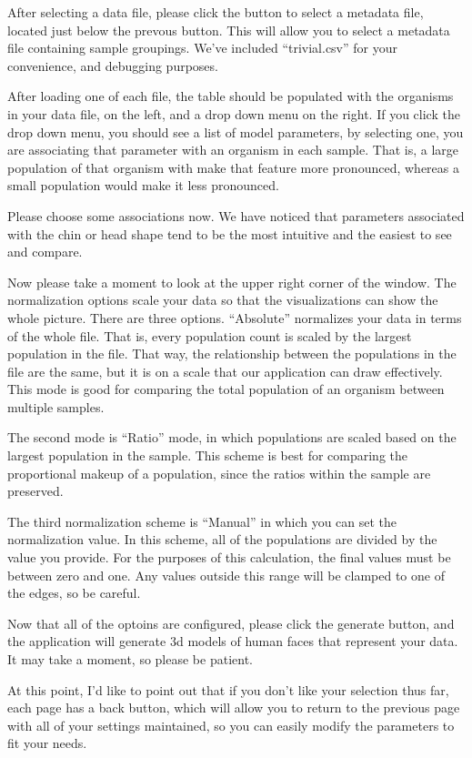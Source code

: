 \documentclass[letterpaper,10pt, onecolumn, draftclsnofoot]{IEEEtran}
\begin{document}
After selecting a data file, please click the button to select a metadata file, located just below the prevous button. This will allow you to select a metadata file containing sample groupings. We've included ``trivial.csv'' for your convenience, and debugging purposes.

After loading one of each file, the table should be populated with the organisms in your data file, on the left, and a drop down menu on the right. If you click the drop down menu, you should see a list of model parameters, by selecting one, you are associating that parameter with an organism in each sample. That is, a large population of that organism with make that feature more pronounced, whereas a small population would make it less pronounced. 

Please choose some associations now. We have noticed that parameters associated with the chin or head shape tend to be the most intuitive and the easiest to see and compare.

Now please take a moment to look at the upper right corner of the window. The normalization options scale your data so that the visualizations can show the whole picture. There are three options. ``Absolute'' normalizes your data in terms of the whole file. That is, every population count is scaled by the largest population in the file. That way, the relationship between the populations in the file are the same, but it is on a scale that our application can draw effectively. This mode is good for comparing the total population of an organism between multiple samples.

The second mode is ``Ratio'' mode, in which populations are scaled based on the largest population in the sample. This scheme is best for comparing the proportional makeup of a population, since the ratios within the sample are preserved.

The third normalization scheme is ``Manual'' in which you can set the normalization value. In this scheme, all of the populations are divided by the value you provide. For the purposes of this calculation, the final values must be between zero and one. Any values outside this range will be clamped to one of the edges, so be careful.

Now that all of the optoins are configured, please click the generate button, and the application will generate 3d models of human faces that represent your data. It may take a moment, so please be patient.

At this point, I'd like to point out that if you don't like your selection thus far, each page has a back button, which will allow you to return to the previous page with all of your settings maintained, so you can easily modify the parameters to fit your needs.
\end{document}
